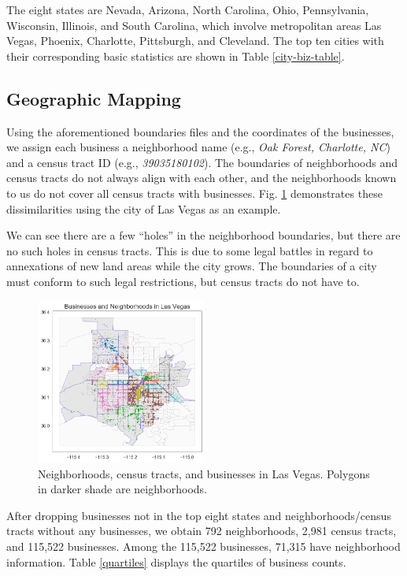 \documentclass[compsoc]{IEEEtran}
\let\MYoriglatexcaption\caption
\renewcommand{\caption}[2][\relax]{\MYoriglatexcaption[#2]{#2}}
\begin{document}
The eight states are Nevada, Arizona, North Carolina, Ohio, Pennsylvania, Wisconsin, Illinois, and South Carolina, which involve metropolitan areas Las Vegas, Phoenix, Charlotte, Pittsburgh, and Cleveland.  The top ten cities with their corresponding basic statistics are shown in Table \ref{city-biz-table}.
 
\subsection{Geographic Mapping}

Using the aforementioned boundaries files and the coordinates of the businesses, we assign each business a neighborhood name (e.g., \textit{Oak Forest, Charlotte, NC}) and a census tract ID (e.g., \textit{39035180102}). The boundaries of neighborhoods and census tracts do not always align with each other, and the neighborhoods known to us do not cover all census tracts with businesses. Fig. \ref{vegas} demonstrates these dissimilarities using the city of Las Vegas as an example.

We can see there are a few ``holes'' in the neighborhood boundaries, but there are no such holes in census tracts. This is due to some legal battles in regard to annexations of new land areas while the city grows. The boundaries of a city must conform to such legal restrictions, but census tracts do not have to.

\begin{figure}[h]
  \hspace{-.5em}
    \includegraphics[width=0.5\textwidth]{las-vegas.png}
  \caption{Neighborhoods, census tracts, and businesses in Las Vegas. Polygons in darker shade are neighborhoods.}
  \label{vegas}
\end{figure}


After dropping businesses not in the top eight states and neighborhoods/census tracts without any businesses, we obtain 792 neighborhoods,  2,981 census tracts, and 115,522 businesses. Among the 115,522 businesses, 71,315 have neighborhood information. Table \ref{quartiles} displays the quartiles of business counts.
\end{document}
